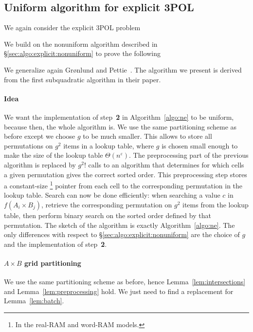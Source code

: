 \subsection{Uniform algorithm for explicit 3POL}%
\label{sec:algo:explicit:uniform}

We again consider the explicit 3POL problem
%
\ProblemPOLExplicit*

We build on the nonuniform algorithm described in
\S\ref{sec:algo:explicit:nonuniform} to prove the following
\TheoremPOLUniformExplicit*

We generalize again Gr\o nlund and Pettie~\cite{GP18}. The
algorithm we present is derived from the first subquadratic algorithm in their
paper.

\paragraph{Idea}
We want the implementation of step~\textbf{2} in Algorithm~\ref{algo:ne} to be
uniform, because then, the whole algorithm is.
We use the same partitioning scheme as before except we choose $g$ to be much
smaller.
This allows to
store all permutations on $g^2$ items in a lookup table, where
$g$ is chosen small enough to make the size of the lookup table $\Theta(n^\varepsilon)$.
The preprocessing part of the previous algorithm is replaced by $ g^2! $ calls to
an algorithm that determines for which cells a given permutation gives the
correct sorted
order. This preprocessing step stores a constant-size%
\footnote{In the real-RAM and word-RAM models.}
pointer from each cell to
the corresponding permutation in the lookup table.
Search can now be done efficiently: when searching a value $c$ in $f(A_i
\times B_j)$, retrieve the corresponding permutation on $g^2$ items from the
lookup table,
then perform binary search on the sorted order defined by that permutation.
The sketch of the algorithm is exactly Algorithm~\ref{algo:ne}. The only
differences with respect to \S\ref{sec:algo:explicit:nonuniform} are the choice
of $g$ and the implementation of step~\textbf{2}.

\paragraph{$A \times B$ grid partitioning}
We use the same partitioning scheme as before, hence
Lemma~\ref{lem:intersections} and Lemma~\ref{lem:preprocessing} hold.
We just need to find a replacement for Lemma~\ref{lem:batch}.

